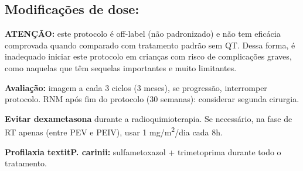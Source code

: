 \documentclass[11pt,a4paper,oldfontcommands]{memoir}
\begin{document}
\subsection{Modificações de dose:}
\textbf{ATENÇÃO:} este protocolo é off-label (não padronizado) e não tem eficácia comprovada quando comparado com tratamento padrão sem QT. Dessa forma, é inadequado iniciar este protocolo em crianças com risco de complicações graves, como naquelas que têm sequelas importantes e muito limitantes.

\textbf{Avaliação:} imagem a cada 3 ciclos (3 meses), se progressão, interromper protocolo. RNM após fim do protocolo (30 semanas): considerar segunda cirurgia.

\textbf{Evitar dexametasona} durante a radioquimioterapia. Se necessário, na fase de RT apenas (entre PEV e PEIV), usar 1 mg/m\textsuperscript{2}/dia cada 8h.

\textbf{Profilaxia textit{P. carinii:}} sulfametoxazol + trimetoprima durante todo o tratamento.
\end{document}
